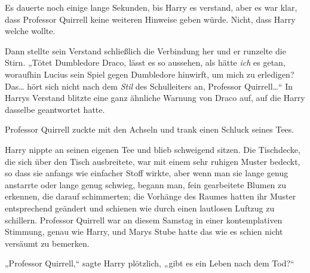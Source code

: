Es dauerte noch einige lange Sekunden, bis Harry es verstand, aber es war klar, dass Professor Quirrell keine weiteren Hinweise geben würde. Nicht, dass Harry welche wollte.

Dann stellte sein Verstand schließlich die Verbindung her und er runzelte die Stirn. „Tötet Dumbledore Draco, lässt es so aussehen, als hätte \emph{ich} es getan, woraufhin Lucius sein Spiel gegen Dumbledore hinwirft, um mich zu erledigen? Das… hört sich nicht nach dem \emph{Stil} des Schulleiters an, Professor Quirrell…“ In Harrys Verstand blitzte eine ganz ähnliche Warnung von Draco auf, auf die Harry dasselbe geantwortet hatte.

Professor Quirrell zuckte mit den Achseln und trank einen Schluck seines Tees.

Harry nippte an seinen eigenen Tee und blieb schweigend sitzen. Die Tischdecke, die sich über den Tisch ausbreitete, war mit einem sehr ruhigen Muster bedeckt, so dass sie anfangs wie einfacher Stoff wirkte, aber wenn man sie lange genug anstarrte oder lange genug schwieg, begann man, fein gearbeitete Blumen zu erkennen, die darauf schimmerten; die Vorhänge des Raumes hatten ihr Muster entsprechend geändert und schienen wie durch einen lautlosen Luftzug zu schillern. Professor Quirrell war an diesem Samstag in einer kontemplativen Stimmung, genau wie Harry, und Marys Stube hatte das wie es schien nicht versäumt zu bemerken.

„Professor Quirrell,“ sagte Harry plötzlich, „gibt es ein Leben nach dem Tod?“

